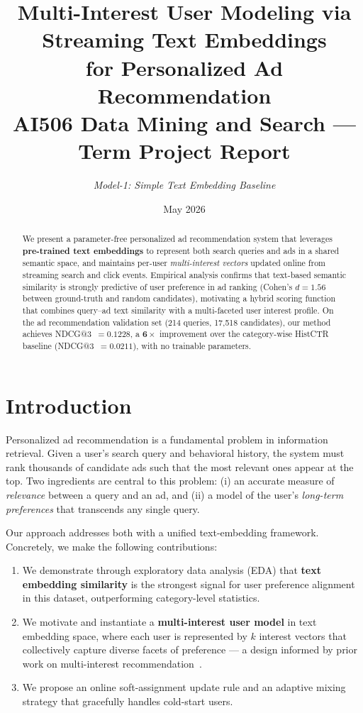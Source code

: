\documentclass[10pt,twocolumn]{article}
\title{\textbf{Multi-Interest User Modeling via Streaming Text Embeddings\\
for Personalized Ad Recommendation}\\[6pt]
{\normalsize AI506 Data Mining and Search --- Term Project Report}}
\author{\textit{Model-1: Simple Text Embedding Baseline}}
\date{May 2026}
\begin{document}
\maketitle

\begin{abstract}
We present a parameter-free personalized ad recommendation system that
leverages \textbf{pre-trained text embeddings} to represent both search
queries and ads in a shared semantic space, and maintains per-user
\emph{multi-interest vectors} updated online from streaming search and
click events.
Empirical analysis confirms that text-based semantic similarity is
strongly predictive of user preference in ad ranking
(Cohen's $d = 1.56$ between ground-truth and random candidates),
motivating a hybrid scoring function that combines query--ad text similarity
with a multi-faceted user interest profile.
On the ad recommendation validation set (214 queries, 17{,}518 candidates),
our method achieves NDCG@3~$= 0.1228$, a $\mathbf{6{\times}}$ improvement
over the category-wise HistCTR baseline (NDCG@3~$= 0.0211$),
with no trainable parameters.
\end{abstract}

\section{Introduction}
\label{sec:intro}

Personalized ad recommendation is a fundamental problem in information
retrieval.
Given a user's search query and behavioral history, the system must rank
thousands of candidate ads such that the most relevant ones appear at the
top.
Two ingredients are central to this problem:
(i) an accurate measure of \emph{relevance} between a query and an ad,
and (ii) a model of the user's \emph{long-term preferences} that
transcends any single query.

Our approach addresses both with a unified text-embedding framework.
Concretely, we make the following contributions:
\begin{enumerate}[leftmargin=*,nosep,itemsep=2pt]
  \item We demonstrate through exploratory data analysis (EDA) that
    \textbf{text embedding similarity} is the strongest signal for user
    preference alignment in this dataset, outperforming category-level
    statistics.
  \item We motivate and instantiate a \textbf{multi-interest user model}
    in text embedding space, where each user is represented by $k$
    interest vectors that collectively capture diverse facets of
    preference --- a design informed by prior work on multi-interest
    recommendation~\cite{li2019mind,cen2020comirec}.
  \item We propose an online soft-assignment update rule and an
    adaptive mixing strategy that gracefully handles cold-start users.
\end{enumerate}
\end{document}
